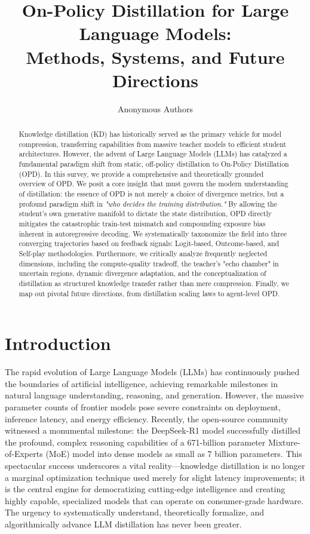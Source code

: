 \documentclass{article} %
\title{On-Policy Distillation for Large Language Models: \\ Methods, Systems, and Future Directions}
\author{Anonymous Authors}
\begin{document}
\ifcolmsubmission
\linenumbers
\fi

\maketitle


\begin{abstract}
Knowledge distillation (KD) has historically served as the primary vehicle for model compression, transferring capabilities from massive teacher models to efficient student architectures. However, the advent of Large Language Models (LLMs) has catalyzed a fundamental paradigm shift from static, off-policy distillation to On-Policy Distillation (OPD). In this survey, we provide a comprehensive and theoretically grounded overview of OPD. We posit a core insight that must govern the modern understanding of distillation: the essence of OPD is not merely a choice of divergence metrics, but a profound paradigm shift in \textit{"who decides the training distribution."} By allowing the student's own generative manifold to dictate the state distribution, OPD directly mitigates the catastrophic train-test mismatch and compounding exposure bias inherent in autoregressive decoding. 
We systematically taxonomize the field into three converging trajectories based on feedback signals: Logit-based, Outcome-based, and Self-play methodologies. Furthermore, we critically analyze frequently neglected dimensions, including the compute-quality tradeoff, the teacher's "echo chamber" in uncertain regions, dynamic divergence adaptation, and the conceptualization of distillation as structured knowledge transfer rather than mere compression. Finally, we map out pivotal future directions, from distillation scaling laws to agent-level OPD.
\end{abstract}

\section{Introduction}
\label{sec:intro}

The rapid evolution of Large Language Models (LLMs) has continuously pushed the boundaries of artificial intelligence, achieving remarkable milestones in natural language understanding, reasoning, and generation. However, the massive parameter counts of frontier models pose severe constraints on deployment, inference latency, and energy efficiency. Recently, the open-source community witnessed a monumental milestone: the DeepSeek-R1 model \citep{2501.12948} successfully distilled the profound, complex reasoning capabilities of a 671-billion parameter Mixture-of-Experts (MoE) model into dense models as small as 7 billion parameters. This spectacular success underscores a vital reality—knowledge distillation is no longer a marginal optimization technique used merely for slight latency improvements; it is the central engine for democratizing cutting-edge intelligence and creating highly capable, specialized models that can operate on consumer-grade hardware. The urgency to systematically understand, theoretically formalize, and algorithmically advance LLM distillation has never been greater.
\end{document}
